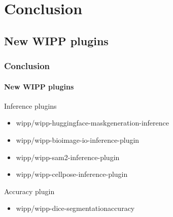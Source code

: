 \def\sectiontitle{Conclusion}

\section{\sectiontitle}

\def\slidetitle{New WIPP plugins}

\subsection{\slidetitle}
\begin{frame}
  \frametitle{\sectiontitle}
  \framesubtitle{\slidetitle}

  Inference plugins
  \begin{itemize}
    \item wipp/wipp-huggingface-maskgeneration-inference
    \item wipp/wipp-bioimage-io-inference-plugin
    \item wipp/wipp-sam2-inference-plugin
    \item wipp/wipp-cellpose-inference-plugin
  \end{itemize}

  Accuracy plugin
  \begin{itemize}
    \item wipp/wipp-dice-segmentationaccuracy
  \end{itemize}

\end{frame}

\def\slidetitle{Fine-tuning plugin}

